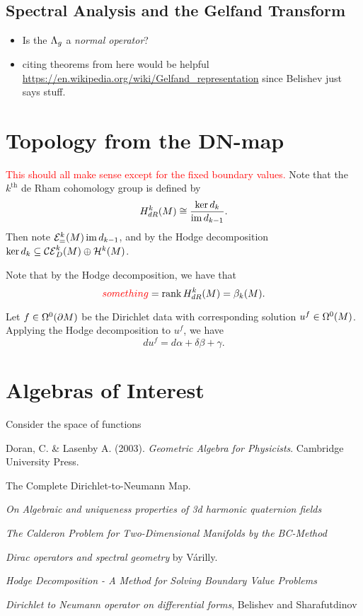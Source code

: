 \documentclass[12pt]{article}
\begin{document}
\subsection{Spectral Analysis and the Gelfand Transform}

\begin{itemize}
	\item Is the $\dnmap$ a \emph{normal operator}? 
	\item citing theorems from here would be helpful \url{https://en.wikipedia.org/wiki/Gelfand_representation} since Belishev just says stuff.
\end{itemize}

\section{Topology from the DN-map}

\textcolor{red}{This should all make sense except for the fixed boundary values.}
Note that the $k^\textrm{th}$ de Rham cohomology group is defined by
\[
H^k_{dR}(M) \cong \frac{\ker d_k}{\im d_{k-1}}.
\]
Then note $\exact{k}=\im d_{k-1}$, and by the Hodge decomposition $\ker d_k \subseteq \coexact{k}{D}\oplus \harmonic{k}{}$.

Note that by the Hodge decomposition, we have that
\[
\textcolor{red}{something} =\operatorname{rank} H^k_{dR}(M) = \beta_k(M).
\]


Let $f\in \boundarykforms{0}$ be the Dirichlet data with corresponding solution $u^f \in \kforms{0}{}$.  Applying the Hodge decomposition to $u^f$, we have
\[
du^f = d\alpha + \delta \beta + \gamma.
\] 


\section{Algebras of Interest}

Consider the space of functions 

\newpage
\begin{thebibliography}{1}
	
	 Doran, C. \& Lasenby A. (2003). \emph{Geometric Algebra for Physicists}. Cambridge University Press.
	
	 The Complete Dirichlet-to-Neumann Map.
	
	 \emph{On Algebraic and uniqueness properties of 3d harmonic quaternion fields}
	
	 \emph{The Calderon Problem for Two-Dimensional Manifolds by the BC-Method}
	
	 \emph{Dirac operators and spectral geometry} by V\'arilly.
	
	 \emph{Hodge Decomposition - A Method for Solving Boundary Value Problems}
	
	 \emph{Dirichlet to Neumann operator on differential forms}, Belishev and Sharafutdinov
	
\end{thebibliography}
\end{document}
